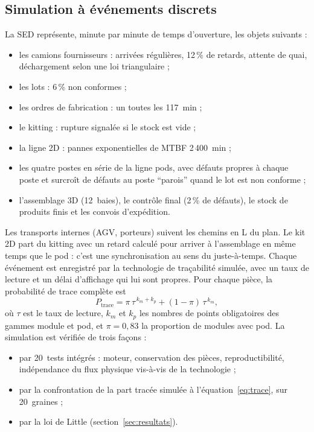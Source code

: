 \documentclass[11pt,a4paper]{article}
\begin{document}
\subsection{Simulation à événements discrets}

La SED représente, minute par minute de temps d'ouverture, les objets suivants :
\begin{itemize}
  \item les camions fournisseurs : arrivées régulières, 12\,\% de retards, attente de quai,
        déchargement selon une loi triangulaire ;
  \item les lots : 6\,\% non conformes ;
  \item les ordres de fabrication : un toutes les 117~min ;
  \item le kitting : rupture signalée si le stock est vide ;
  \item la ligne 2D : pannes exponentielles de MTBF 2\,400~min ;
  \item les quatre postes en série de la ligne pods, avec défauts propres à chaque poste et
        surcroît de défauts au poste \enquote{parois} quand le lot est non conforme ;
  \item l'assemblage 3D (12~baies), le contrôle final (2\,\% de défauts), le stock de produits
        finis et les convois d'expédition.
\end{itemize}

Les transports internes (AGV, porteurs) suivent les chemins en L du plan. Le kit 2D part du
kitting avec un retard calculé pour arriver à l'assemblage en même temps que le pod : c'est une
synchronisation au sens du juste-à-temps. Chaque événement est enregistré par la technologie de
traçabilité simulée, avec un taux de lecture et un délai d'affichage qui lui sont propres. Pour
chaque pièce, la probabilité de trace complète est
\begin{equation}\label{eq:trace}
P_{\text{trace}} = \pi\,\tau^{\,k_m+k_p} + (1-\pi)\,\tau^{\,k_m},
\end{equation}
où $\tau$ est le taux de lecture, $k_m$ et $k_p$ les nombres de points obligatoires des gammes
module et pod, et $\pi = 0{,}83$ la proportion de modules avec pod. La simulation est vérifiée
de trois façons :
\begin{itemize}
  \item par 20~tests intégrés : moteur, conservation des pièces, reproductibilité,
        indépendance du flux physique vis-à-vis de la technologie ;
  \item par la confrontation de la part tracée simulée à l'équation~\eqref{eq:trace}, sur
        20~graines ;
  \item par la loi de Little (section~\ref{sec:resultats}).
\end{itemize}
\end{document}
